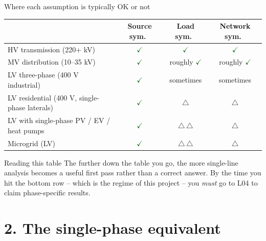 \documentclass[aspectratio=169,10pt]{beamer}
\newcommand{\checkitem}{\textcolor{darkgreen}{\Large$\checkmark$}\;}
\newcommand{\warnitem}{\textcolor{warnorange}{\Large$\triangle$}\;}
\begin{document}
\begin{frame}{Where each assumption is typically OK or not}
\centering
\small
\begin{tabular}{lccc}
\toprule
 & Source sym.\ & Load sym.\ & Network sym.\ \\
\midrule
HV transmission (220+ kV) & \checkitem & \checkitem & \checkitem \\
MV distribution (10--35 kV) & \checkitem & roughly \checkitem & roughly \checkitem \\
LV three-phase (400 V industrial) & \checkitem & sometimes & sometimes \\
LV residential (400 V, single-phase laterals) & \checkitem & \warnitem & \warnitem \\
LV with single-phase PV / EV / heat pumps & \checkitem & \warnitem\,\warnitem & \warnitem \\
Microgrid (LV) & \checkitem & \warnitem\,\warnitem & \warnitem \\
\bottomrule
\end{tabular}
\vspace{0.6em}
\begin{block}{Reading this table}
The further down the table you go, the more single-line analysis becomes a useful first pass rather than a correct answer. By the time you hit the bottom row -- which is the regime of this project -- you \emph{must} go to L04 to claim phase-specific results.
\end{block}
\end{frame}

\section*{2. The single-phase equivalent}
\end{document}
